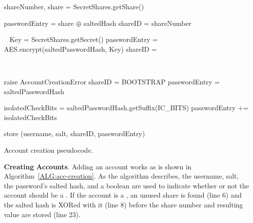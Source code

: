 \begin{algorithm}
\footnotesize
\begin{algorithmic}[1]
    \vspace{.1cm}
    \State {}

     


            \State {}
            \State shareNumber, share = SecretShares.getShare()
            
            \State {}
            \State passwordEntry = share $\oplus$ saltedHash
            \State shareID = shareNumber

        \vspace{.11cm}
        \Else~
            \State Key = SecretShares.getSecret() 
            \State passwordEntry = AES.encrypt(saltedPasswordHash, Key)
            \State shareID = \THRESHOLDLESS
        \EndIf

    \vspace{.1cm}
    \Else~

            \State raise AccountCreationError
        \Else
            \State shareID = BOOTSTRAP
        \EndIf 
        \State passwordEntry = saltedPasswordHash
    \EndIf

    \State {}
    \State isolatedCheckBits = saltedPasswordHash.getSuffix(IC\_BITS)
    \State passwordEntry += isolatedCheckBits 

    \State store (username, salt, shareID, passwordEntry)
    \EndFunction

\end{algorithmic}
\caption{\small Account creation pseudocode.
\label{ALG:acc-creation}}
\end{algorithm}

{\bf Creating Accounts}.  Adding an account works as is shown in
Algorithm~\ref{ALG:acc-creation}.  As the algorithm describes, the username,
salt, the password’s salted hash, and a boolean are used to indicate whether or
not the account should be a \thresholdaccount. If the account is a
\thresholdaccount, an unused share is found (line 6) and the salted hash is
XORed with it (line 8) before the share number and resulting value are stored
(line 23).  

